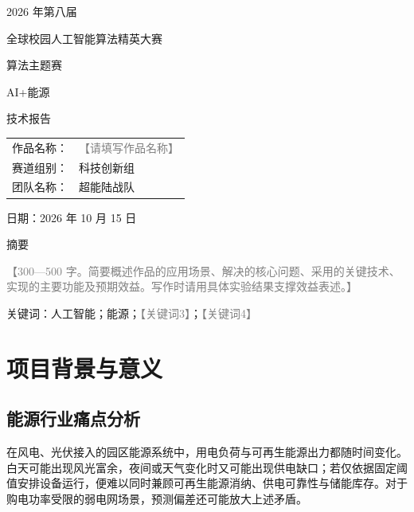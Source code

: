 \documentclass[UTF8,a4paper,zihao=-4]{ctexart}
\newcommand{\fillhint}[1]{\textcolor{gray}{【#1】}}
\newcommand{\worktitle}{\fillhint{请填写作品名称}}
\newcommand{\teamname}{超能陆战队}
\newcommand{\reportdate}{2026 年 10 月 15 日}
\begin{document}
\thispagestyle{fancy}
\begin{center}

  \vspace*{0.9cm}
  {\heiti{} 2026 年第八届\par}
  \vspace{0.15cm}
  {\heiti{} 全球校园人工智能算法精英大赛\par}
  \vspace{2.25cm}
  {\heiti{} 算法主题赛\par}
  \vspace{0.12cm}
  {\heiti{} AI+能源\par}
  \vspace{0.13cm}
  {\heiti{} 技术报告\par}
  \vspace{3.7cm}
  \renewcommand{\arraystretch}{2.1}
  \hspace*{-1.8cm}
  \begin{tabular}{@{}rl@{}}
    作品名称： & \worktitle \\
    赛道组别： & 科技创新组 \\
    团队名称： & \teamname
  \end{tabular}
  \par\vspace{5.35cm}
  { 日期：\reportdate\par}
\end{center}
\clearpage

{\heiti\fontsize{15pt}{18pt}\selectfont 摘要\par}
\fillhint{300—500 字。简要概述作品的应用场景、解决的核心问题、采用的关键技术、实现的主要功能及预期效益。写作时请用具体实验结果支撑效益表述。}

\vspace{1em}
\noindent 关键词：人工智能；能源；\fillhint{关键词3}；\fillhint{关键词4}
\clearpage

\section{项目背景与意义}
\subsection{能源行业痛点分析}
在风电、光伏接入的园区能源系统中，用电负荷与可再生能源出力都随时间变化。白天可能出现风光富余，夜间或天气变化时又可能出现供电缺口；若仅依据固定阈值安排设备运行，便难以同时兼顾可再生能源消纳、供电可靠性与储能库存。对于购电功率受限的弱电网场景，预测偏差还可能放大上述矛盾。
\end{document}
